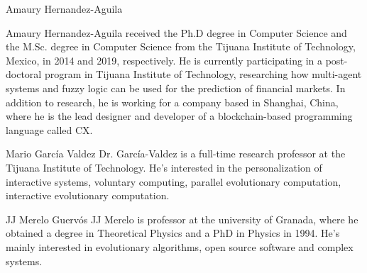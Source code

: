 \documentclass{ieeeaccess}
\begin{document}
\begin{IEEEbiography}{Amaury
  Hernandez-Aguila}

  Amaury Hernandez-Aguila received the Ph.D degree in Computer Science and the
  M.Sc. degree in Computer Science from the Tijuana Institute of Technology,
  Mexico, in 2014 and 2019, respectively. He is currently participating in a
  post-doctoral program in Tijuana Institute of Technology, researching how
  multi-agent systems and fuzzy logic can be used for the prediction of
  financial markets. In addition to research, he is working for a company based
  in Shanghai, China, where he is the lead designer and developer of a
  blockchain-based programming language called CX.

\end{IEEEbiography}

\begin{IEEEbiography}{Mario García Valdez} 
  Dr. García-Valdez is a full-time research professor at the Tijuana
  Institute of Technology. He's interested in the personalization of
  interactive systems, voluntary computing, parallel evolutionary
  computation, interactive evolutionary computation.
\end{IEEEbiography}

\begin{IEEEbiography}{JJ Merelo Guervós} 
  JJ Merelo is professor at the university of Granada, where he obtained a
  degree in Theoretical Physics and a PhD in Physics in 1994. He's mainly
  interested in evolutionary algorithms, open source software and complex
  systems.
  
\end{IEEEbiography}
\end{document}
